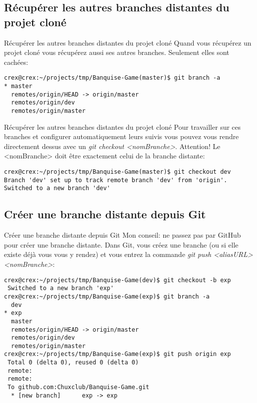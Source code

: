 \documentclass{beamer}
\begin{document}
\subsection{Récupérer les autres branches distantes du projet cloné}
\begin{frame}[fragile]{Récupérer les autres branches distantes du projet cloné}
Quand vous récupérez un projet cloné vous récupérez aussi ses autres branches. Seulement elles sont cachées:
\begin{mdframed}[style=Bash]
    \begin{lstlisting}[style=Bash, caption={Afficher les branches cachées}]
crex@crex:~/projects/tmp/Banquise-Game(master)$ git branch -a
* master
  remotes/origin/HEAD -> origin/master
  remotes/origin/dev
  remotes/origin/master
    \end{lstlisting}
\end{mdframed}
\end{frame}

\begin{frame}[fragile]{Récupérer les autres branches distantes du projet cloné}
Pour travailler sur ces branches et configurer automatiquement leurs suivis vous pouvez vous rendre directement dessus avec un \textit{git checkout <nomBranche>}. Attention! Le <nomBranche> doit être exactement celui de la branche distante:
\begin{mdframed}[style=Bash]
    \begin{lstlisting}[style=Bash, caption={Suivre une branche distante du projet}]
crex@crex:~/projects/tmp/Banquise-Game(master)$ git checkout dev
Branch 'dev' set up to track remote branch 'dev' from 'origin'.
Switched to a new branch 'dev'
    \end{lstlisting}
\end{mdframed}
\end{frame}


\subsection{Créer une branche distante depuis Git}
\begin{frame}[fragile]{Créer une branche distante depuis Git}
Mon conseil: ne passez pas par GitHub pour créer une branche distante. Dans Git, vous créez une branche (ou si elle existe déjà vous vous y rendez) et vous entrez la commande \textit{git push <aliasURL> <nomBranche>}:
\begin{mdframed}[style=Bash]
    \begin{lstlisting}[style=Bash, caption={Ajouter une branche distante au projet depuis Git}]
crex@crex:~/projects/tmp/Banquise-Game(dev)$ git checkout -b exp
 Switched to a new branch 'exp'
crex@crex:~/projects/tmp/Banquise-Game(exp)$ git branch -a
  dev
* exp
  master
  remotes/origin/HEAD -> origin/master
  remotes/origin/dev
  remotes/origin/master
crex@crex:~/projects/tmp/Banquise-Game(exp)$ git push origin exp
 Total 0 (delta 0), reused 0 (delta 0)
 remote: 
 remote: 
 To github.com:Chuxclub/Banquise-Game.git
  * [new branch]      exp -> exp
    \end{lstlisting}
\end{mdframed}
\end{frame}
\end{document}
